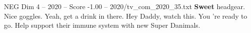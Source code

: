 \begin{textsample}{NEG Dim 4 – 2020 – Score -1.00 – 2020/tv\_com\_2020\_35.txt}  \label{ex:f4_neg_062}
\textbf{Sweet} headgear.
Nice goggles.
Yeah, get a drink in there.
Hey Daddy, watch this.
You 're ready to go.
Help support their immune system with new Super Danimals.

\end{textsample}
